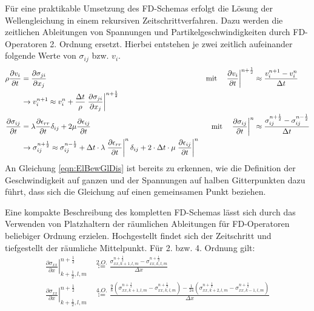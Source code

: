 \documentclass[pdftex,a4paper,parskip,listof=totoc,bibliography=totoc,onehalfspacing,12pt]{scrreprt}
\begin{document}
Für eine praktikable Umsetzung des FD-Schemas erfolgt die Lösung der Wellengleichung in einem rekursiven Zeitschrittverfahren. Dazu werden die zeitlichen Ableitungen von Spannungen und Partikelgeschwindigkeiten durch FD-Operatoren 2. Ordnung ersetzt. Hierbei entstehen je zwei zeitlich aufeinander folgende Werte von $\sigma_{ij}$ bzw. $v_i$.
\begin{align}
	\rho \frac{\partial v_i}{\partial t} &= \frac{\partial \sigma_{ji}}{\partial x_j} ~ &\text{mit} \quad \left.\frac{\partial v_i}{\partial t}\right\rvert^{n+\frac{1}{2}} &\approx \frac{v_i^{n+1} - v_i^{n}}{\Delta t}\notag\\
	&\rightarrow v_i^{n+1} \approx v_i^n + \frac{\Delta t}{\rho}  \left.\frac{\partial \sigma_{ji}}{\partial x_j}\right\rvert^{n+\frac{1}{2}}\label{eqn:ElBewGlDis}\\
	\frac{\partial \sigma_{ij}}{\partial t} &= \lambda \frac{\partial \epsilon_{rr}}{\partial t} \delta_{ij} + 2 \mu \frac{\partial \epsilon_{ij}}{\partial t} ~ &\text{mit} \quad \left.\frac{\partial \sigma_{ij}}{\partial t}\right\rvert^n &\approx \frac{\sigma_{ij}^{n+\frac{1}{2}} - \sigma_{ij}^{n-\frac{1}{2}}}{\Delta t}\notag\\
	&\rightarrow \sigma_{ij}^{n+\frac{1}{2}} \approx \sigma_{ij}^{n-\frac{1}{2}} + \Delta t \cdot \lambda \left.\frac{\partial \epsilon_{rr}}{\partial t}\right\rvert^n \delta_{ij} + 2 \cdot \Delta t \cdot \mu \left.\frac{\partial \epsilon_{ij}}{\partial t}\right\rvert^n
\end{align}
An Gleichung \ref{eqn:ElBewGlDis} ist bereits zu erkennen, wie die Definition der Geschwindigkeit auf ganzen und der Spannungen auf halben Gitterpunkten dazu führt, dass sich die Gleichung auf einen gemeinsamen Punkt beziehen.

Eine kompakte Beschreibung des kompletten FD-Schemas lässt sich durch das Verwenden von Platzhaltern der räumlichen Ableitungen für FD-Operatoren beliebiger Ordnung erzielen. Hochgestellt findet sich der Zeitschritt und tiefgestellt der räumliche Mittelpunkt. Für 2. bzw. 4. Ordnung gilt:
\begin{align}
	\left.\frac{\partial\sigma_{xx}}{\partial x}\right\rvert_{k+\frac{1}{2},l,m}^{n+\frac{1}{2}} &\overset{2.O.}{\coloneqq} \frac{\sigma_{xx,k+1,l,m}^{n+\frac{1}{2}} - \sigma_{xx,k,l,m}^{n+\frac{1}{2}}}{\Delta x}\label{eqn:FDO2O}\\
	\left.\frac{\partial\sigma_{xx}}{\partial x}\right\rvert_{k+\frac{1}{2},l,m}^{n+\frac{1}{2}} &\overset{4.O.}{\coloneqq} \frac{\frac{9}{8}\left(\sigma_{xx,k+1,l,m}^{n+\frac{1}{2}} - \sigma_{xx,k,l,m}^{n+\frac{1}{2}}\right) - \frac{1}{24}\left(\sigma_{xx,k+2,l,m}^{n+\frac{1}{2}} - \sigma_{xx,k-1,l,m}^{n+\frac{1}{2}}\right)}{\Delta x}
\end{align}
\end{document}
